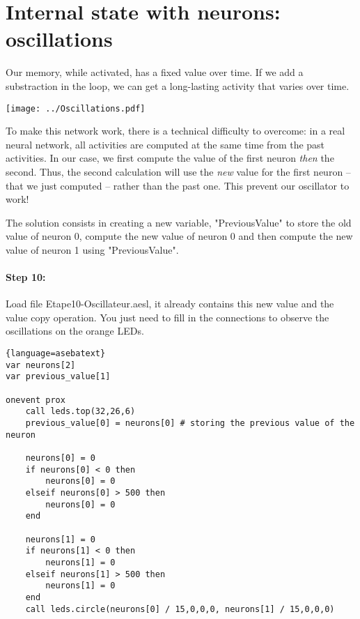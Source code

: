 \documentclass[12pt]{article}
\newcommand{\secondfile}{Etape10-Oscillateur.aesl}
\begin{document}
\section{Internal state with neurons: oscillations}

Our memory, while activated, has a fixed value over time. If we add a substraction in the loop, we can get a long-lasting activity that varies over time.

\begin{center}
\texttt{[image: ../Oscillations.pdf]}
\end{center}


To make this network work, there is a technical difficulty to overcome: in a real neural network, all activities are computed at the same time from the past activities. In our case, we first compute the value of the first neuron \emph{then} the second. Thus, the second calculation will use the \emph{new} value for the first neuron -- that we just computed -- rather than the past one. This prevent our oscillator to work!

The solution consists in creating a new variable, "PreviousValue" to store the old value of neuron 0, compute the new value of neuron 0 and then compute the new value of neuron 1 using "PreviousValue".

\paragraph{Step 10:} Load file \secondfile, it already contains this new value and the value copy operation. You just need to fill in the connections to observe the oscillations on the orange LEDs.

\begin{lstlisting}{language=asebatext}
var neurons[2]
var previous_value[1]

onevent prox
    call leds.top(32,26,6)
    previous_value[0] = neurons[0] # storing the previous value of the neuron
    
    neurons[0] = 0
    if neurons[0] < 0 then
        neurons[0] = 0
    elseif neurons[0] > 500 then
        neurons[0] = 0
    end

    neurons[1] = 0
    if neurons[1] < 0 then
        neurons[1] = 0
    elseif neurons[1] > 500 then
        neurons[1] = 0
    end
    call leds.circle(neurons[0] / 15,0,0,0, neurons[1] / 15,0,0,0)
\end{lstlisting}

\end{document}
